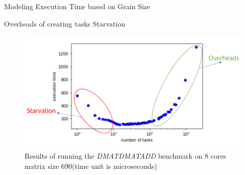 \documentclass[10pt]{beamer}
\begin{document}
\begin{frame}{Modeling Execution Time based on Grain Size}
	\begin{outline}		
		\1Overheads of creating tasks
		\1Starvation
		\begin{figure}
			\includegraphics[width=0.9\linewidth]{figures/true_1_annotated.png}	
			\caption{Results of running the \textit{DMATDMATADD} benchmark on 8 cores matrix size 690(time unit is microseconds)}	
		\end{figure}
	\end{outline}
\end{frame}
\end{document}
